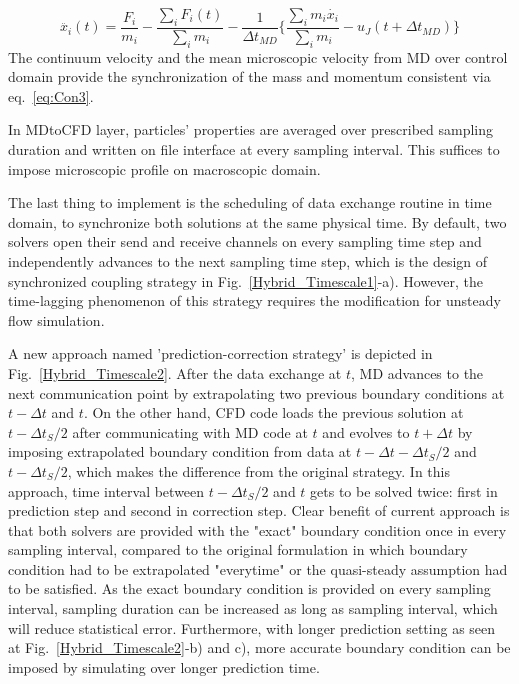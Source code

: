 \documentclass[conference,final]{IEEEtran}
\begin{document}
\vspace{-.2em}
\begin{equation}
 \ddot{x_{i}}(t) = \frac{F_{i}}{m_{i}} -  \frac{\displaystyle\sum_{i}F_{i}(t)} {\displaystyle\sum_{i}m_{i}} - \frac{1}{\Delta t_{MD}} \{  \frac{\displaystyle\sum_{i}m_{i}\dot{x_{i}}} {\displaystyle\sum_{i}m_{i}} - u_{J}(t + \Delta t_{MD})\}
 \label{eq:Con3}
\end{equation}
\normalsize
The continuum velocity and the mean microscopic velocity from MD over control domain provide the synchronization of the mass and momentum consistent via eq.~\ref{eq:Con3}.

In MDtoCFD layer, particles' properties are averaged over prescribed sampling duration and written on file interface at every sampling interval. This suffices to impose microscopic profile on macroscopic domain.


The last thing to implement is the scheduling of data exchange routine in time domain, to synchronize both solutions at the same physical time. By default, two solvers open their send and receive channels on every sampling time step and independently advances to the next sampling time step, which is the design of synchronized coupling strategy in Fig.~\ref{Hybrid_Timescale1}-a). However, the time-lagging phenomenon of this strategy requires the modification for unsteady flow simulation.

A new approach named 'prediction-correction strategy' is depicted in Fig.~\ref{Hybrid_Timescale2}. After the data exchange at $t$, MD advances to the next communication point by extrapolating two previous boundary conditions at $t-\Delta t$ and $t$. On the other hand, CFD code loads the previous solution at $t-{\Delta}t_{S}/{2}$ after communicating with MD code at $t$ and evolves to $t+{\Delta}t$ by imposing extrapolated boundary condition from data at $t-\Delta t - {\Delta}t_{S}/{2}$ and $t-{\Delta}t_{S}/{2}$, which makes the difference from the original strategy. In this approach, time interval between $t - {\Delta}t_{S}/{2}$ and $t$ gets to be solved twice: first in prediction step and second in correction step. Clear benefit of current approach is that both solvers are provided with the "exact" boundary condition once in every sampling interval, compared to the original formulation in which boundary condition had to be extrapolated "everytime" or the quasi-steady assumption had to be satisfied. As the exact boundary condition is provided on every sampling interval, sampling duration can be increased as long as sampling interval, which will reduce statistical error. Furthermore, with longer prediction setting as seen at Fig.~\ref{Hybrid_Timescale2}-b) and c), more accurate boundary condition can be imposed by simulating over longer prediction time.
\end{document}
